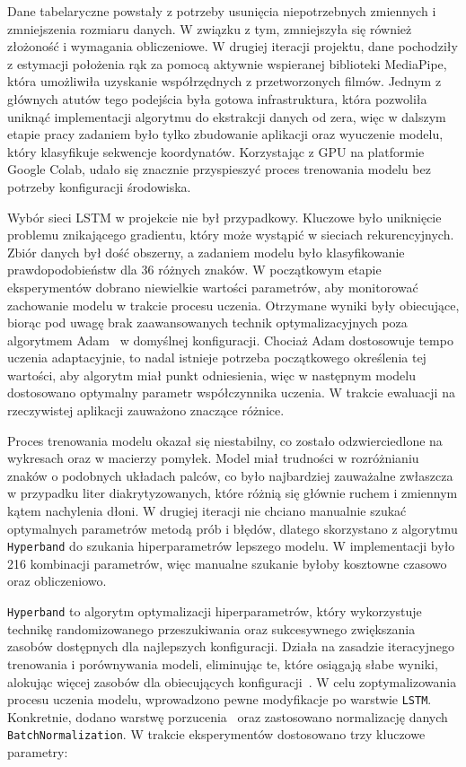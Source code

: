 Dane tabelaryczne powstały z potrzeby usunięcia niepotrzebnych zmiennych i zmniejszenia rozmiaru danych. W związku z tym, zmniejszyła się również złożoność i wymagania obliczeniowe. W drugiej iteracji projektu, dane pochodziły z estymacji położenia rąk za pomocą aktywnie wspieranej biblioteki MediaPipe, która umożliwiła uzyskanie współrzędnych z przetworzonych filmów. Jednym z głównych atutów tego podejścia była gotowa infrastruktura, która pozwoliła uniknąć implementacji algorytmu do ekstrakcji danych od zera, więc w dalszym etapie pracy zadaniem było tylko zbudowanie aplikacji oraz wyuczenie modelu, który klasyfikuje sekwencje koordynatów. Korzystając z GPU na platformie Google Colab, udało się znacznie przyspieszyć proces trenowania modelu bez potrzeby konfiguracji środowiska.

Wybór sieci LSTM w projekcie nie był przypadkowy. Kluczowe było uniknięcie problemu znikającego gradientu, który może wystąpić w sieciach rekurencyjnych. Zbiór danych był dość obszerny, a zadaniem modelu było klasyfikowanie prawdopodobieństw dla 36 różnych znaków. W początkowym etapie eksperymentów dobrano niewielkie wartości parametrów, aby monitorować zachowanie modelu w trakcie procesu uczenia. Otrzymane wyniki były obiecujące, biorąc pod uwagę brak zaawansowanych technik optymalizacyjnych poza algorytmem Adam~\cite{kingma2015} w domyślnej konfiguracji. Chociaż Adam dostosowuje tempo uczenia adaptacyjnie, to nadal istnieje potrzeba początkowego określenia tej wartości, aby algorytm miał punkt odniesienia, więc w następnym modelu dostosowano optymalny parametr współczynnika uczenia. W trakcie ewaluacji na rzeczywistej aplikacji zauważono znaczące różnice.

Proces trenowania modelu okazał się niestabilny, co zostało odzwierciedlone na wykresach oraz w macierzy pomyłek. Model miał trudności w rozróżnianiu znaków o podobnych układach palców, co było najbardziej zauważalne zwłaszcza w przypadku liter diakrytyzowanych, które różnią się głównie ruchem i zmiennym kątem nachylenia dłoni. W drugiej iteracji nie chciano manualnie szukać optymalnych parametrów metodą prób i błędów, dlatego skorzystano z algorytmu \texttt{Hyperband} do szukania hiperparametrów lepszego modelu. W implementacji było 216 kombinacji parametrów, więc manualne szukanie byłoby kosztowne czasowo oraz obliczeniowo.

\texttt{Hyperband} to algorytm optymalizacji hiperparametrów, który wykorzystuje technikę randomizowanego przeszukiwania oraz sukcesywnego zwiększania zasobów dostępnych dla najlepszych konfiguracji. Działa na zasadzie iteracyjnego trenowania i porównywania modeli, eliminując te, które osiągają słabe wyniki, alokując więcej zasobów dla obiecujących konfiguracji~\cite{li2017}. W celu zoptymalizowania procesu uczenia modelu, wprowadzono pewne modyfikacje po warstwie \texttt{LSTM}. Konkretnie, dodano warstwę porzucenia~\cite{hinton2012} oraz zastosowano normalizację danych \texttt{BatchNormalization}. W trakcie eksperymentów dostosowano trzy kluczowe parametry:

